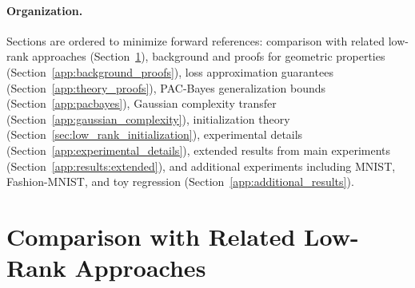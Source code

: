 \documentclass{article}
\theoremstyle{plain}
\theoremstyle{definition}
\theoremstyle{remark}
\begin{document}
\paragraph{Organization.} Sections are ordered to minimize forward references: comparison with related low-rank approaches (Section~\ref{sec:relatedwork}), background and proofs for geometric properties (Section~\ref{app:background_proofs}), loss approximation guarantees (Section~\ref{app:theory_proofs}), PAC-Bayes generalization bounds (Section~\ref{app:pacbayes}), Gaussian complexity transfer (Section~\ref{app:gaussian_complexity}), initialization theory (Section~\ref{sec:low_rank_initialization}), experimental details (Section~\ref{app:experimental_details}), extended results from main experiments (Section~\ref{app:results:extended}), and additional experiments including MNIST, Fashion-MNIST, and toy regression (Section~\ref{app:additional_results}).

\clearpage

\section{Comparison with Related Low-Rank Approaches}
\label{sec:relatedwork}
\begin{table}[!ht]
\centering
\caption{Comparison with related low-rank approaches for BNNs. Our method is the only approach that (i) learns both backbone and uncertainty end-to-end without pretrained models, (ii) reduces both mean and variance parameterization, and (iii) induces a geometrically singular posterior.}
\label{tab:related_work}
\end{table}
\end{document}
